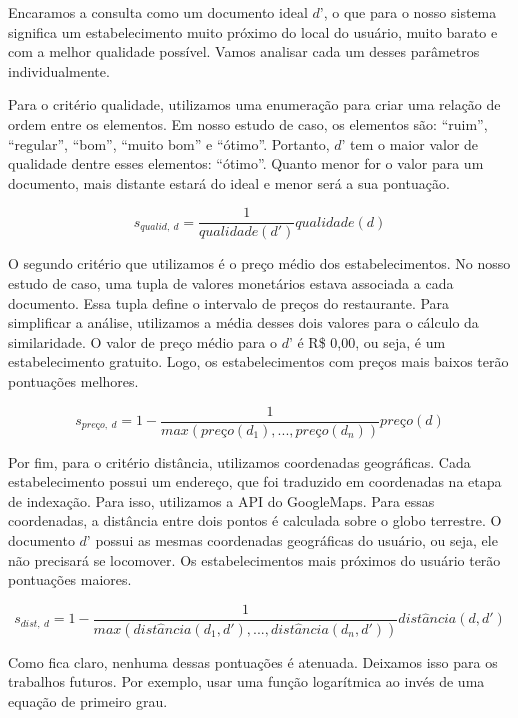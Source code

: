 Encaramos a consulta como um documento ideal $d’$, o que para o nosso sistema significa um estabelecimento muito próximo do local do usuário, muito barato e com a melhor qualidade possível. Vamos analisar cada um desses parâmetros individualmente.

Para o critério qualidade, utilizamos uma enumeração para criar uma relação de ordem entre os elementos. Em nosso estudo de caso, os elementos são: ``ruim'', ``regular'', ``bom'', ``muito bom'' e ``ótimo''. Portanto, $d’$ tem o maior valor de qualidade dentre esses elementos: ``ótimo''. Quanto menor for o valor para um documento, mais distante estará do ideal e menor será a sua pontuação.

\begin{displaymath}
	s_{qualid,\ d} = \frac{1}{qualidade(d')}qualidade(d)	
\end{displaymath}

O segundo critério que utilizamos é o preço médio dos estabelecimentos. No nosso estudo de caso, uma tupla de valores monetários estava associada a cada documento. Essa tupla define o intervalo de preços do restaurante. Para simplificar a análise, utilizamos a média desses dois valores para o cálculo da similaridade. O valor de preço médio para o $d’$ é R\$ 0,00, ou seja, é um estabelecimento gratuito. Logo, os estabelecimentos com preços mais baixos terão pontuações melhores.

\begin{displaymath}
	s_{\textit{pre\c{c}o},\ d} = 1 - \frac{1}{max(\textit{pre\c{c}o}(d_{1}), ..., \textit{pre\c{c}o}(d_{n}))}\textit{pre\c{c}o}(d)
\end{displaymath}

Por fim, para o critério distância, utilizamos coordenadas geográficas. Cada estabelecimento possui um endereço, que foi traduzido em coordenadas na etapa de indexação. Para isso, utilizamos a API do GoogleMaps. Para essas coordenadas, a distância entre dois pontos é calculada sobre o globo terrestre. O documento $d’$ possui as mesmas coordenadas geográficas do usuário, ou seja, ele não precisará se locomover. Os estabelecimentos mais próximos do usuário terão pontuações maiores.

\begin{displaymath}
	s_{dist,\ d} = 1 - \frac{1}{max(dist\hat{a}ncia(d_{1}, d'), ..., dist\hat{a}ncia(d_{n}, d'))}dist\hat{a}ncia(d, d')
\end{displaymath}

Como fica claro, nenhuma dessas pontuações é atenuada. Deixamos isso para os trabalhos futuros. Por exemplo, usar uma função logarítmica ao invés de uma equação de primeiro grau.

